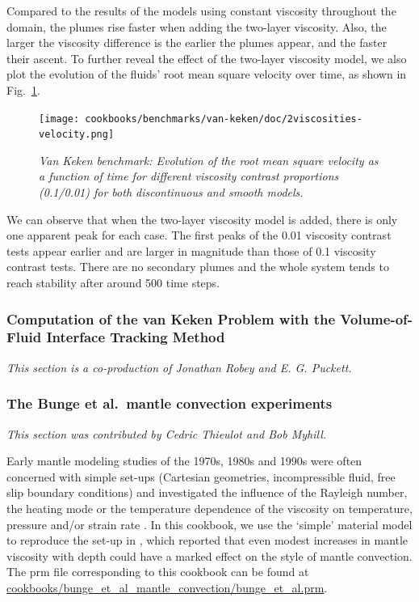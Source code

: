 \documentclass{article}
\begin{document}
Compared to the results of the models using constant viscosity throughout the domain, the plumes rise faster when adding the two-layer viscosity. Also, the larger the viscosity difference is the earlier the plumes appear, and the faster their ascent. To further reveal the effect of the two-layer viscosity model, we also plot the evolution of the fluids' root mean square velocity over time, as shown in Fig.~\ref{fig:vk-9}.

\begin{figure}
        \centering
        \texttt{[image: cookbooks/benchmarks/van-keken/doc/2viscosities-velocity.png]}
        \caption{\it Van Keken benchmark: Evolution of the root mean square velocity as a function of time for different viscosity contrast proportions (0.1/0.01) for both discontinuous and smooth models.}
        \label{fig:vk-9}
\end{figure}

We can observe that when the two-layer viscosity model is added, there is only one apparent peak for each case. The first peaks of the 0.01 viscosity contrast tests appear earlier and are larger in magnitude than those of 0.1 viscosity contrast tests.  There are no secondary plumes and the whole system tends to reach stability after around 500 time steps.


\subsubsection{Computation of the van Keken Problem with the Volume-of-Fluid Interface Tracking Method}
\label{sec:van-keken VOF interface tracking}

\textit{This section is a co-production of Jonathan Robey and E. G. Puckett.}




\subsubsection{The Bunge et al.~mantle convection experiments}
\label{sec:bunge_et_al_cookbook}

\textit{This section was contributed by Cedric Thieulot and Bob Myhill.}

Early mantle modeling studies of the 1970s, 1980s and 1990s were often concerned with simple set-ups (Cartesian geometries, incompressible fluid, free slip boundary conditions) and investigated the influence of the Rayleigh number, the heating mode or the temperature dependence of the viscosity on temperature, pressure and/or strain rate \cite{youn74,buss75,buss79,BBC89,BC93,vavy93,burb97}. In this cookbook, we use the `simple' material model to reproduce the set-up in \cite{burb96}, which reported that even modest increases in mantle viscosity with depth could have a marked effect on the style of mantle convection. The prm file corresponding to this cookbook can be found at \url{cookbooks/bunge_et_al_mantle_convection/bunge_et_al.prm}.
\end{document}
